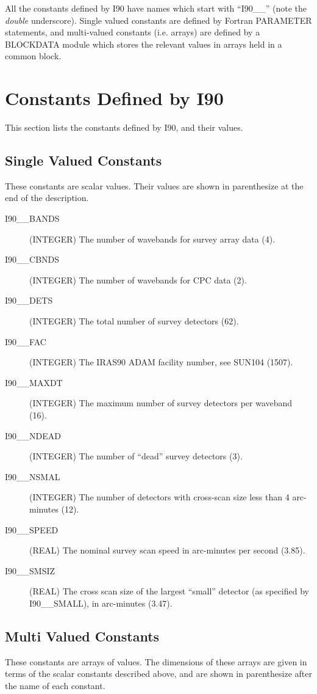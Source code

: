 All the constants defined by I90 have names which start with ``I90\_\_''
(note the {\em double} underscore). Single valued constants are defined by
Fortran PARAMETER statements, and multi-valued constants (i.e. arrays) are
defined by a BLOCKDATA module which stores the relevant values in arrays held in
a common block. \footnotemark 
{}

\section{Constants Defined by I90}

This section lists the constants defined by I90, and their values.
\subsection{Single Valued Constants}
These constants are scalar values. Their values are shown in parenthesize at the 
end of the description.
\begin{description}
\item [I90\_\_BANDS] (INTEGER) The number of wavebands for survey array data (4).
\item [I90\_\_CBNDS] (INTEGER) The number of wavebands for CPC data (2).
\item [I90\_\_DETS]  (INTEGER) The total number of survey detectors (62).
\item [I90\_\_FAC]   (INTEGER) The IRAS90 ADAM facility number, see SUN104 (1507).
\item [I90\_\_MAXDT] (INTEGER) The maximum number of survey detectors per 
waveband (16).
\item [I90\_\_NDEAD] (INTEGER) The number of ``dead'' survey detectors (3).
\item [I90\_\_NSMAL] (INTEGER) The number of detectors with cross-scan size less 
than 4 arc-minutes (12).
\item [I90\_\_SPEED] (REAL) The nominal survey scan speed in arc-minutes per
second (3.85).
\item [I90\_\_SMSIZ] (REAL) The cross scan size of the largest ``small'' 
detector (as specified by I90\_\_SMALL), in arc-minutes (3.47).
\end{description}

\newpage
\subsection{Multi Valued Constants}
These constants are arrays of values. The dimensions of these arrays are given 
in terms of the scalar constants described above, and are shown in parenthesize 
after the name of each constant.

